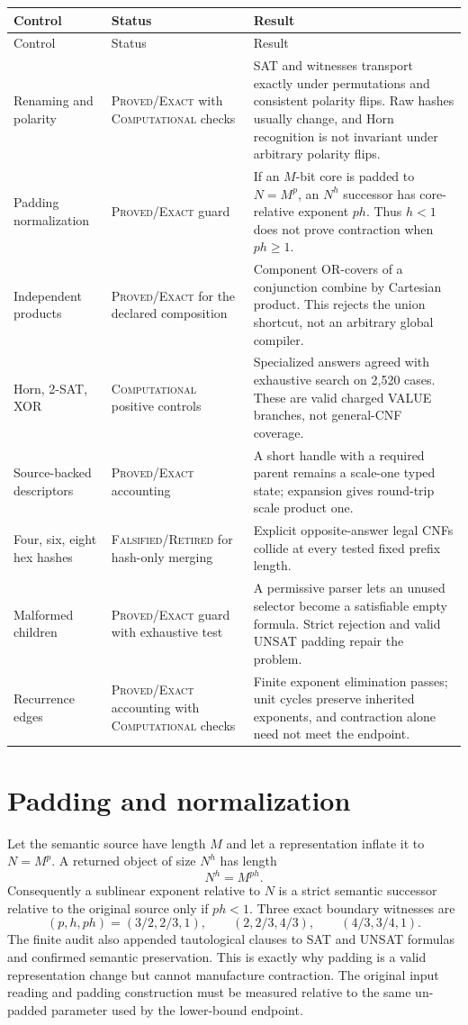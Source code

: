\documentclass[11pt]{article}
\newcommand{\Exact}{\textsc{Proved/Exact}}
\newcommand{\Comp}{\textsc{Computational}}
\newcommand{\Retired}{\textsc{Falsified/}\allowbreak\textsc{Retired}}
\begin{document}
\begin{longtable}{L{0.25\textwidth}L{0.20\textwidth}L{0.47\textwidth}}
\toprule
Control & Status & Result \\
\midrule
\endfirsthead
\toprule
Control & Status & Result \\
\midrule
\endhead
\bottomrule
\endfoot
Renaming and polarity & \Exact{} with \Comp{} checks & SAT and witnesses
transport exactly under permutations and consistent polarity flips.  Raw
hashes usually change, and Horn recognition is not invariant under arbitrary
polarity flips. \\
Padding normalization & \Exact{} guard & If an $M$-bit core is padded to
$N=M^p$, an $N^h$ successor has core-relative exponent $ph$.  Thus $h<1$
does not prove contraction when $ph\ge1$. \\
Independent products & \Exact{} for the declared composition & Component
OR-covers of a conjunction combine by Cartesian product.  This rejects the
union shortcut, not an arbitrary global compiler. \\
Horn, 2-SAT, XOR & \Comp{} positive controls & Specialized answers agreed
with exhaustive search on 2,520 cases.  These are valid charged VALUE
branches, not general-CNF coverage. \\
Source-backed descriptors & \Exact{} accounting & A short handle with a
required parent remains a scale-one typed state; expansion gives round-trip
scale product one. \\
Four, six, eight hex hashes & \Retired{} for hash-only merging & Explicit
opposite-answer legal CNFs collide at every tested fixed prefix length. \\
Malformed children & \Exact{} guard with exhaustive test & A permissive
parser lets an unused selector become a satisfiable empty formula.  Strict
rejection and valid UNSAT padding repair the problem. \\
Recurrence edges & \Exact{} accounting with \Comp{} checks & Finite exponent
elimination passes; unit cycles preserve inherited exponents, and contraction
alone need not meet the endpoint. \\
\end{longtable}

\section{Padding and normalization}

Let the semantic source have length $M$ and let a representation inflate it
to $N=M^p$.  A returned object of size $N^h$ has length
\[
       N^h=M^{ph}.
\]
Consequently a sublinear exponent relative to $N$ is a strict semantic
successor relative to the original source only if $ph<1$.  Three exact
boundary witnesses are
\[
 (p,h,ph)=(3/2,2/3,1),\qquad
 (2,2/3,4/3),\qquad
 (4/3,3/4,1).
\]
The finite audit also appended tautological clauses to SAT and UNSAT formulas
and confirmed semantic preservation.  This is exactly why padding is a valid
representation change but cannot manufacture contraction.  The original
input reading and padding construction must be measured relative to the same
un-padded parameter used by the lower-bound endpoint.
\end{document}
